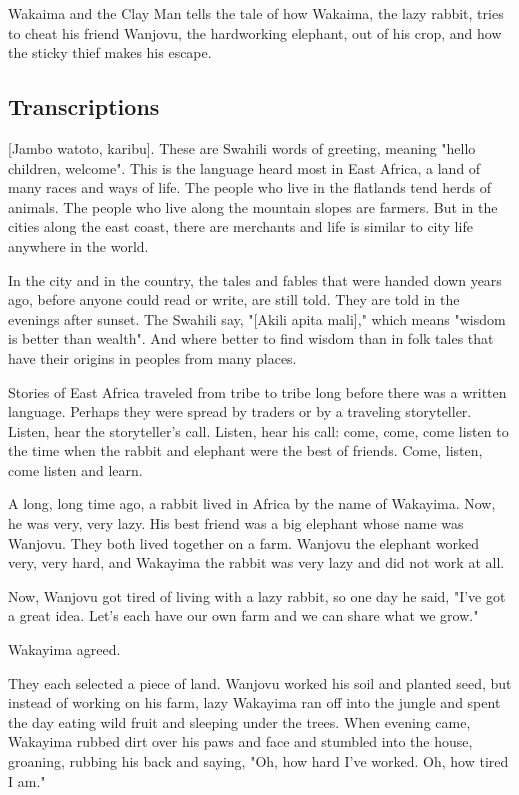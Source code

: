 Wakaima and the Clay Man tells the tale of how Wakaima, the lazy rabbit, tries to cheat his friend Wanjovu, the hardworking elephant, out of his crop, and how the sticky thief makes his escape.

\subsection{Transcriptions}

[Jambo watoto, karibu]. These are Swahili words of greeting, meaning "hello children, welcome". This is the language heard most in East Africa, a land of many races and ways of life. The people who live in the flatlands tend herds of animals. The people who live along the mountain slopes are farmers. But in the cities along the east coast, there are merchants and life is similar to city life anywhere in the world.

In the city and in the country, the tales and fables that were handed down years ago, before anyone could read or write, are still told. They are told in the evenings after sunset. The Swahili say, "[Akili apita mali]," which means "wisdom is better than wealth". And where better to find wisdom than in folk tales that have their origins in peoples from many places.

Stories of East Africa traveled from tribe to tribe long before there was a written language. Perhaps they were spread by traders or by a traveling storyteller. Listen, hear the storyteller's call. Listen, hear his call: come, come, come listen to the time when the rabbit and elephant were the best of friends. Come, listen, come listen and learn.

A long, long time ago, a rabbit lived in Africa by the name of Wakayima. Now, he was very, very lazy. His best friend was a big elephant whose name was Wanjovu. They both lived together on a farm. Wanjovu the elephant worked very, very hard, and Wakayima the rabbit was very lazy and did not work at all.

Now, Wanjovu got tired of living with a lazy rabbit, so one day he said, "I've got a great idea. Let's each have our own farm and we can share what we grow."

Wakayima agreed.

They each selected a piece of land. Wanjovu worked his soil and planted seed, but instead of working on his farm, lazy Wakayima ran off into the jungle and spent the day eating wild fruit and sleeping under the trees. When evening came, Wakayima rubbed dirt over his paws and face and stumbled into the house, groaning, rubbing his back and saying, "Oh, how hard I've worked. Oh, how tired I am."

